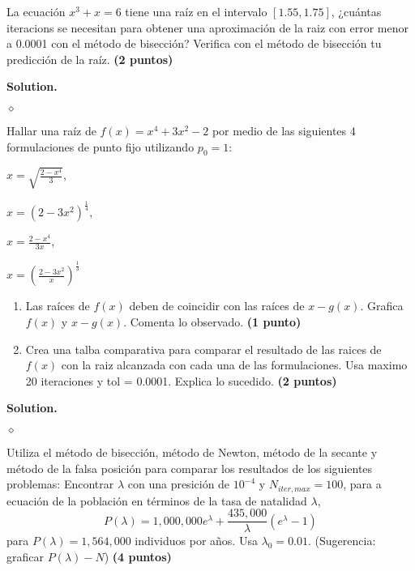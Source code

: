\documentclass{article}
\theoremstyle{problemstyle}
\newenvironment{solution}{%
  \begin{mdframed}[linewidth=0.8pt,linecolor=Gray,backgroundcolor=Gray!5,roundcorner=5pt]%
  \noindent\textbf{Solution.}%
}{%
\hfill $ \diamond $ 
  \end{mdframed}%
}
\begin{document}
\begin{problem}
La ecuaci\'on $ x^3+x = 6 $ tiene una ra\'iz en el intervalo $ [1.55, 1.75] $, ¿cu\'antas iteracions se necesitan para obtener una aproximaci\'on de la raiz con error menor a 0.0001 con el m\'etodo de bisecci\'on? Verifica con el m\'etodo de bisecci\'on tu predicci\'on de la ra\'iz. \textbf{(2 puntos)}
\end{problem}
\begin{solution}
  
\end{solution}

\begin{problem}
Hallar una ra\'iz de $ f(x) = x^4 + 3x^2 - 2 $ por medio de las siguientes 4 formulaciones de punto fijo utilizando $ p_0 = 1 $:
\begin{center}
	\begin{enumerate*}[label=\alph*),itemjoin=\qquad]

		\item $\displaystyle x = \sqrt{\frac{2-x^4}{3}} $,
		\item $\displaystyle x = (2-3x^2)^{\frac{1}{4}}$,
		\item $\displaystyle x = \frac{2-x^4}{3x} $,
		\item $\displaystyle x = \left(\frac{2-3x^2}{x}\right)^{\frac{1}{3}}$
	\end{enumerate*}
\end{center}

\begin{enumerate}
	\item Las ra\'ices de $ f(x) $ deben de coincidir con las ra\'ices de $ x-g(x) $. Grafica $ f(x) $ y $ x-g(x) $. Comenta lo observado. \textbf{(1 punto)}

	\item Crea una talba comparativa para comparar el resultado de las raices de $f(x) $ con la raiz alcanzada con cada una de las formulaciones. Usa maximo 20 iteraciones y tol = 0.0001. Explica lo sucedido. \textbf{(2 puntos)}
\end{enumerate}
\end{problem}
\begin{solution}

\end{solution}

\begin{problem}
Utiliza el m\'etodo de bisecci\'on, m\'etodo de Newton, m\'etodo de la secante y m\'etodo de la falsa posici\'on para comparar los resultados de los siguientes problemas:
Encontrar $ \lambda $ con una presici\'on de $ 10^{-4} $ y $ N_{iter, max} = 100 $, para a ecuaci\'on de la poblaci\'on en t\'erminos de la tasa de natalidad $ \lambda $,
\[
	P(\lambda) = 1,000,000 e^{\lambda} + \frac{435,000}{\lambda}(e^{\lambda} - 1)
\]
para $ P(\lambda) = 1,564,000 $ individuos por a\~nos. Usa $ \lambda_0 = 0.01 $. (Sugerencia: graficar $ P(\lambda) - N $) \textbf{(4 puntos)}
\end{problem}




\end{document}
